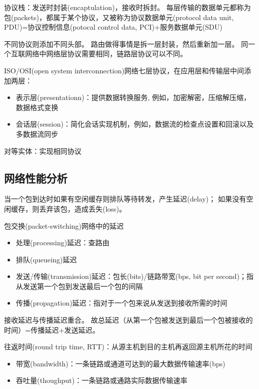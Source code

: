 协议栈：发送时封装(encaptulation)，接收时拆封。
每层传输的数据单元都称为包(packets)，都属于某个协议，又被称为协议数据单元(protocol data unit, PDU)=协议控制信息(potocal control data, PCI)+服务数据单元(SDU)
\begin{center}
\end{center}
不同协议则添加不同头部。
路由做得事情是拆一层封装，然后重新加一层。
同一个互联网络中网络层协议需要相同，链路层协议可以不同。


ISO/OSI(open system interconnection)网络七层协议，在应用层和传输层中间添加两层：
\begin{itemize}
	\item 表示层(presentationn)：提供数据转换服务, 例如，加密解密，压缩解压缩，数据格式变换
	\item 会话层(session)：简化会话实现机制，例如，数据流的检查点设置和回滚以及多数据流同步
\end{itemize}

对等实体：实现相同协议

\subsection{网络性能分析}
当一个包到达时如果有空闲缓存则排队等待转发，产生延迟(delay)；
如果没有空闲缓存，则丢弃该包，造成丢失(loss)。

包交换(packet-switching)网络中的延迟
\begin{itemize}
	\item 处理(processing)延迟：查路由
	\item 排队(queueing)延迟
	\item 发送/传输(transmission)延迟：包长(bits)/链路带宽(bps, bit per second)；指从发送第一个包到发送最后一个包的间隔
	\item 传播(propagation)延迟：指对于一个包来说从发送到接收所需的时间
\end{itemize}
接收延迟与传播延迟重合。
故总延迟（从第一个包被发送到最后一个包被接收的时间）=传播延迟+发送延迟。

往返时间(round trip time, RTT)：从源主机到目的主机再返回源主机所花的时间

\begin{itemize}
	\item 带宽(bandwidth)：一条链路或通道可达到的最大数据传输速率(bps)
	\item 吞吐量(thoughput)：一条链路或通路实际数据传输速率
\end{itemize}